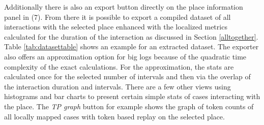  Additionally there is also an export button directly on the place information panel in (7). From there it is possible to export a compiled dataset of all interactions with the selected place enhanced with the localized metrics calculated for the duration of the interaction as discussed in Section \ref{alltogether}. Table \ref{tab:datasettable} shows an example for an extracted dataset. The exporter also offers an approximation option for big logs because of the quadratic time complexity of the exact calculations. For the approximation, the stats are calculated once for the selected number of intervals and then via the overlap of the interaction duration and intervals. There are a few other views using histograms and bar charts to present certain simple stats of cases interacting with the place. The \emph{TP graph} button for example shows the graph of token counts of all locally mapped cases with token based replay on the selected place.
